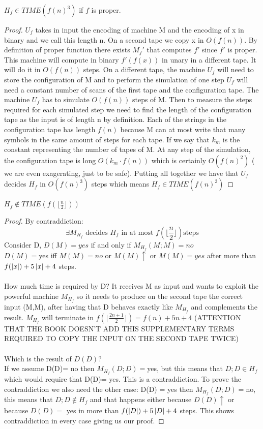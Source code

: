 \begin{lemma}
    $H_f \in TIME(f(n)^3)$ if $f$ is proper.
    \begin{proof}
        $U_f$ takes in input the encoding of machine M and the encoding of x in binary and we call this length n. On a second tape we copy x in $O(f(n))$. By definition of proper function there exists $M_f'$ that computes $f'$ since $f'$ is proper. This machine will compute in binary $f'(f(x))$ in unary in a different tape. It will do it in $O(f(n))$ steps. On a different tape, the machine $ U_f $ will need to store the configuration of M and to perform the simulation of one step $U_f$ will need a constant number of scans of the first tape and the configuration tape. The machine $U_f$ has to simulate $O(f(n))$ steps of M. Then to measure the steps required for each simulated step we need to find the length of the configuration tape as the input is of length n by definition. Each of the strings in the configuration tape has length $f(n)$ because M can at most write that many symbols in the same amount of steps for each tape. If we say that $k_m$ is the constant representing the number of tapes of M. At any step of the simulation, the configuration tape is long $O(k_m\cdot f(n))$ which is certainly $O(f(n)^2)$ ( we are even exagerating, just to be safe). Putting all together we have that $U_f$ decides $H_f$ in $O(f(n)^3)$ steps which means $H_f \in TIME(f(n)^3)$
    \end{proof}
\end{lemma}
\begin{lemma}
    $H_f \notin TIME(f(\lfloor \frac{n}{2}\rfloor))$
    \begin{proof}
        By contraddiction:
        \[ 
            \exists M_{H_f} \text{ decides } H_f \text{ in at most } f(\lfloor \frac{n}{2}\rfloor) \text{steps}
        \]
        Consider D, $D(M) = yes$ if and only if $M_{H_f}(M;M) = no$\\
        $D(M) = $yes iff $M(M) = no$ or $M(M)\uparrow$ or $M(M)=yes$ after more than $f(\left\lvert x\right\rvert)+5\left\lvert x\right\rvert+4$ steps.\\\\ How much time is required by D? It receives M as input and wants to exploit the powerful machine $M_{H_f}$ so it needs to produce on the second tape the correct input (M,M), after having that D behaves exactly like $M_{H_f}$ and complements the result. $M_{H_f}$ will terminate in $f(\lfloor\frac{2n+1}{2}\rfloor) = f(n)+5n+4$ (ATTENTION THAT THE BOOK DOESN'T ADD THIS SUPPLEMENTARY TERMS REQUIRED TO COPY THE INPUT ON THE SECOND TAPE TWICE)\\\\
        Which is the result of $D(D)$?\\
        If we assume D(D)= no then $M_{H_f}(D;D) = $yes, but this means that $D;D \in H_f$ which would require that D(D)= yes. This is a contraddiction. To prove the contraddiction we also need the other case: D(D) = yes then $M_{H_f}(D;D) =$no, this means that $D;D \notin H_f$ and that happens either because $D(D)\uparrow$ or because $D(D) = $ yes in more than $f(\left\lvert D\right\rvert)+5\left\lvert D\right\rvert+4 $ steps. This shows contraddiction in every case giving us our proof.
    \end{proof}
\end{lemma}
